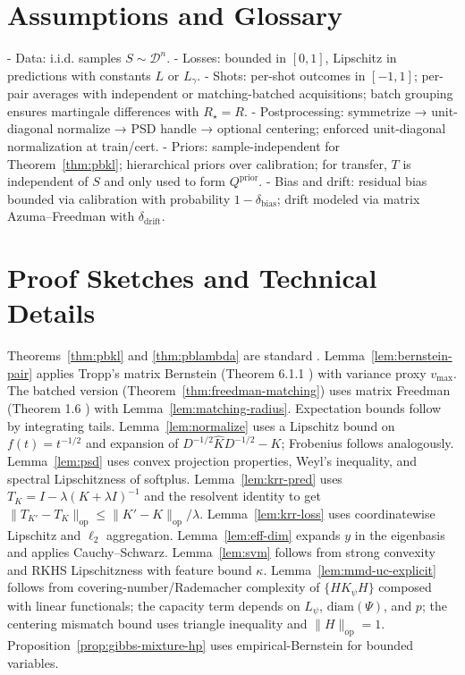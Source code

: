 \documentclass{article}
\begin{document}
\appendix

\section{Assumptions and Glossary}\label{app:assumptions}
- Data: i.i.d. samples $S\sim \mathcal{D}^n$.
- Losses: bounded in $[0,1]$, Lipschitz in predictions with constants $L$ or $L_\gamma$.
- Shots: per-shot outcomes in $[-1,1]$; per-pair averages with independent or matching-batched acquisitions; batch grouping ensures martingale differences with $R_\star=R$.
- Postprocessing: symmetrize → unit-diagonal normalize → PSD handle → optional centering; enforced unit-diagonal normalization at train/cert.
- Priors: sample-independent for Theorem~\ref{thm:pbkl}; hierarchical priors over calibration; for transfer, $T$ is independent of $S$ and only used to form $Q^{\mathrm{prior}}$.
- Bias and drift: residual bias bounded via calibration with probability $1-\delta_{\mathrm{bias}}$; drift modeled via matrix Azuma–Freedman with $\delta_{\mathrm{drift}}$.

\section{Proof Sketches and Technical Details}\label{app:proofs}
Theorems~\ref{thm:pbkl} and \ref{thm:pblambda} are standard \cite{seeger2002pac, maurer2004note, thiemann2017strongly}. Lemma~\ref{lem:bernstein-pair} applies Tropp’s matrix Bernstein (Theorem 6.1.1 \cite{tropp2012user}) with variance proxy $v_{\max}$. The batched version (Theorem~\ref{thm:freedman-matching}) uses matrix Freedman (Theorem 1.6 \cite{tropp2012user}) with Lemma~\ref{lem:matching-radius}. Expectation bounds follow by integrating tails. Lemma~\ref{lem:normalize} uses a Lipschitz bound on $f(t)=t^{-1/2}$ and expansion of $D^{-1/2}\widehat{K}D^{-1/2}-K$; Frobenius follows analogously. Lemma~\ref{lem:psd} uses convex projection properties, Weyl’s inequality, and spectral Lipschitzness of softplus. Lemma~\ref{lem:krr-pred} uses $T_K=I-\lambda(K+\lambda I)^{-1}$ and the resolvent identity to get $\|T_{K'}-T_K\|_{\mathrm{op}}\le \|K'-K\|_{\mathrm{op}}/\lambda$. Lemma~\ref{lem:krr-loss} uses coordinatewise Lipschitz and $\ell_2$ aggregation. Lemma~\ref{lem:eff-dim} expands $y$ in the eigenbasis and applies Cauchy–Schwarz. Lemma~\ref{lem:svm} follows from strong convexity and RKHS Lipschitzness with feature bound $\kappa$. Lemma~\ref{lem:mmd-uc-explicit} follows from covering-number/Rademacher complexity of $\{HK_\psi H\}$ composed with linear functionals; the capacity term depends on $L_\psi$, $\mathrm{diam}(\Psi)$, and $p$; the centering mismatch bound uses triangle inequality and $\|H\|_{\mathrm{op}}=1$. Proposition~\ref{prop:gibbs-mixture-hp} uses empirical-Bernstein for bounded variables.
\end{document}
